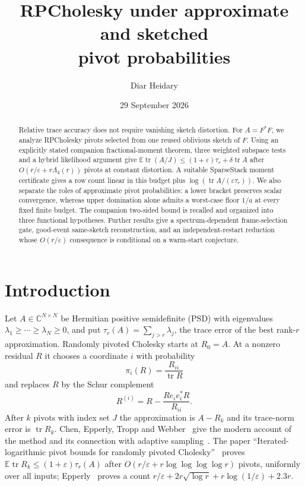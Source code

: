 \documentclass[11pt]{article}
\title{RPCholesky under approximate and sketched\\ pivot probabilities}
\author{Diar Heidary}
\date{29 September 2026}
\theoremstyle{definition}\newtheorem{definition}[theorem]{Definition}
\theoremstyle{remark}\newtheorem{remark}[theorem]{Remark}
\newcommand{\C}{\mathbb C}
\newcommand{\E}{\mathbb E}
\newcommand{\eps}{\varepsilon}
\newcommand{\tr}{\operatorname{tr}}
\newcommand{\1}{\mathbf 1}
\begin{document}
\maketitle

\begin{abstract}
Relative trace accuracy does not require vanishing sketch distortion.
For $A=F^*F$, we analyze RPCholesky pivots selected from one reused
oblivious sketch of $F$. Using an explicitly stated companion
fractional-moment theorem, three weighted subspace tests and a hybrid
likelihood argument give
$\E\tr(A/J)\le(1+\eps)\tau_r+\delta\tr A$ after
$O(r/\eps+r\Lambda_4(r))$ pivots at constant distortion. A suitable
SparseStack moment certificate gives a row count linear in this budget
plus $\log(\tr A/(\eps\tau_r))$.
We also separate the roles of approximate pivot probabilities: a lower
bracket preserves scalar convergence, whereas upper domination alone
admits a worst-case floor $1/a$ at every fixed finite budget. The
companion two-sided bound is recalled and organized into three functional
hypotheses. Further results give a spectrum-dependent frame-selection
gate, good-event same-sketch reconstruction, and an independent-restart
reduction whose $O(r/\eps)$ consequence is conditional on a warm-start
conjecture.
\end{abstract}

\tableofcontents
\clearpage
\section{Introduction}\label{sec:intro}
Let $A\in\C^{N\times N}$ be Hermitian positive semidefinite (PSD) with
eigenvalues $\lambda_1\ge\cdots\ge\lambda_N\ge0$, and put
$\tau_r(A)=\sum_{j>r}\lambda_j$, the trace error of the best rank-$r$
approximation. Randomly pivoted Cholesky starts at $R_0=A$. At a nonzero
residual $R$ it chooses a coordinate $i$ with probability
\begin{equation}\label{eq:pi}
 \pi_i(R)=\frac{R_{ii}}{\tr R}
\end{equation}
and replaces $R$ by the Schur complement
\begin{equation}\label{eq:schur}
 R^{(i)}=R-\frac{Re_ie_i^*R}{R_{ii}} .
\end{equation}
After $k$ pivots with index set $J$ the approximation is $A-R_k$ and
its trace-norm error is $\tr R_k$. Chen, Epperly, Tropp and
Webber~\cite{CETW} give the modern account of the method and its
connection with adaptive sampling~\cite{DRVW,DV}. The paper
``Iterated-logarithmic pivot bounds for randomly pivoted
Cholesky''~\cite{RA01} proves $\E\tr R_k\le(1+\eps)\tau_r(A)$ after
$O(r/\eps+r\log\log\log\log r)$ pivots, uniformly over all inputs;
Epperly~\cite{Epperly2026} proves a count
$r/\eps+2r\sqrt{\log r}+r\log(1/\eps)+2.3r$.
\end{document}
